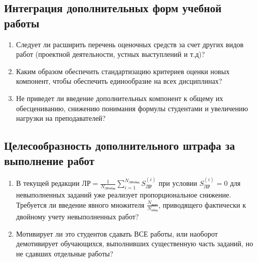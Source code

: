 \documentclass[10pt,a4paper]{article}
\begin{document}
    \subsection{Интеграция дополнительных форм учебной работы}
    \begin{enumerate}
        \item Следует ли расширить перечень оценочных средств за счет других видов работ (проектной деятельности, устных выступлений и т.д)?

        \item Каким образом обеспечить стандартизацию критериев оценки новых компонент, чтобы обеспечить единообразие на всех дисциплинах?

        \item Не приведет ли введение дополнительных компонент к общему их обесцениванию, снижению понимания формулы студентами и увеличению нагрузки на преподавателей?
    \end{enumerate}

    \subsection{Целесообразность дополнительного штрафа за выполнение работ}
    \begin{enumerate}
        \item В текущей редакции $\text{ЛР} = \frac{1}{N_{\text{ЛРобщ}}} \sum\limits_{i=1}^{N_{\text{ЛРобщ}}} S_{\text{ЛР}}^{(i)}$ при условии $S_{\text{ЛР}}^{(i)} = 0$ для невыполненных заданий уже реализует пропорциональное снижение. Требуется ли введение явного множителя $\frac{N_{\text{вып}}}{N_{\text{общ}}}$, приводящего фактически к двойному учету невыполненных работ?

        \item Мотивирует ли это студентов сдавать ВСЕ работы, или наоборот демотивирует обучающихся, выполнивших существенную часть заданий, но не сдавших отдельные работы?
    \end{enumerate}
\end{document}
